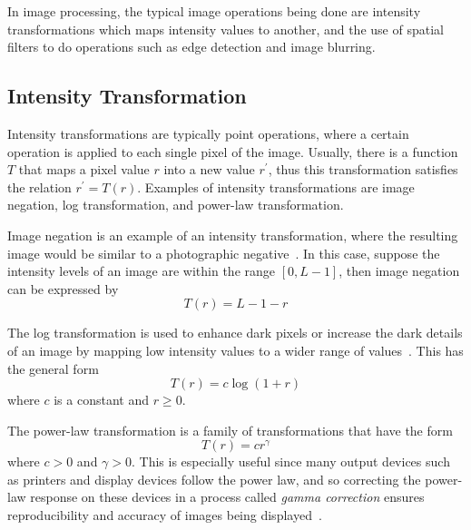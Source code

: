 
In image processing, the typical image operations being done are intensity transformations which maps intensity values to another, and the use of spatial filters to do operations such as edge detection and image blurring. 

\subsection{Intensity Transformation}
Intensity transformations are typically point operations, where a certain operation is applied to each single pixel of the image. Usually, there is a function $T$ that maps a pixel value $r$ into a new value $r^\prime$, thus this transformation satisfies the relation $r^\prime = T\left(r\right)$. Examples of intensity transformations are image negation, log transformation, and power-law transformation.

Image negation is an example of an intensity transformation, where the resulting image would be similar to a photographic negative~\cite{gonzalez_digital_2008}. In this case, suppose the intensity levels of an image are within the range $\left[0, L-1\right]$, then image negation can be expressed by
\begin{equation}
    T\left(r\right) = L-1-r
\end{equation}

The log transformation is used to enhance dark pixels or increase the dark details of an image by mapping low intensity values to a wider range of values~\cite{gonzalez_digital_2008}. This has the general form
\begin{equation}
    T\left(r\right) = c \log\left(1 + r\right)
\end{equation}
where $c$ is a constant and $r \ge 0$.

The power-law transformation is a family of transformations that have the form
\begin{equation}
    T\left(r\right) = c r^{\gamma}
\end{equation}
where $c>0$ and $\gamma > 0$. This is especially useful since many output devices such as printers and display devices follow the power law, and so correcting the power-law response on these devices in a process called \textit{gamma correction} ensures reproducibility and accuracy of images being displayed~\cite{gonzalez_digital_2008}.

